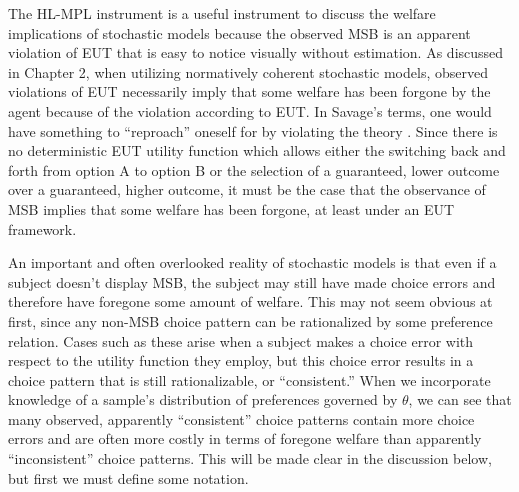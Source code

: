 \documentclass[../main.tex]{subfiles}
\begin{document}
The HL-MPL instrument is a useful instrument to discuss the welfare implications of stochastic models because the observed MSB is an apparent violation of EUT that is easy to notice visually without estimation.
As discussed in Chapter 2, when utilizing normatively coherent stochastic models, observed violations of EUT necessarily imply that some welfare has been forgone by the agent because of the violation according to EUT.
In Savage's terms, one would have something to \enquote{reproach} oneself for by violating the theory \parencite[230]{Moscati2016}.
Since there is no deterministic EUT utility function which allows either the switching back and forth from option A to option B or the selection of a guaranteed, lower outcome over a guaranteed, higher outcome, it must be the case that the observance of MSB implies that some welfare has been forgone, at least under an EUT framework.

An important and often overlooked reality of stochastic models is that even if a subject doesn't display MSB, the subject may still have made choice errors and therefore have foregone some amount of welfare.
This may not seem obvious at first, since any non-MSB choice pattern can be rationalized by some preference relation.
Cases such as these arise when a subject makes a choice error with respect to the utility function they employ, but this choice error results in a choice pattern that is still rationalizable, or \enquote{consistent.}
When we incorporate knowledge of a sample's distribution of preferences governed by $\theta$, we can see that many observed, apparently \enquote{consistent} choice patterns contain more choice errors and are often more costly in terms of foregone welfare than apparently \enquote{inconsistent} choice patterns.
This will be made clear in the discussion below, but first we must define some notation.
\end{document}
